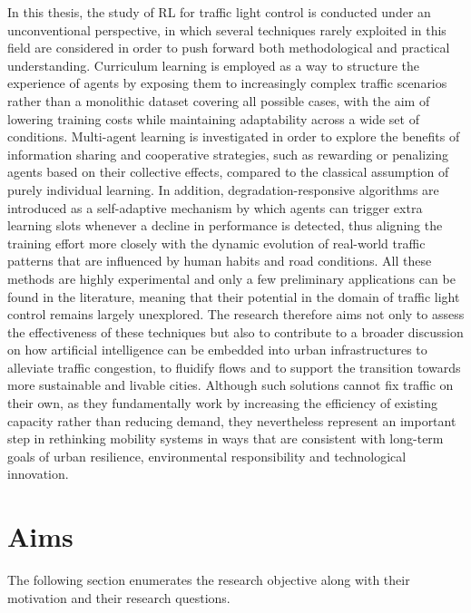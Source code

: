 In this thesis, the study of RL for traffic light control is conducted under an unconventional perspective, in which several techniques rarely exploited in this field are considered in order to push forward both methodological and practical understanding.
Curriculum learning is employed as a way to structure the experience of agents by exposing them to increasingly complex traffic scenarios rather than a monolithic dataset covering all possible cases, with the aim of lowering training costs while maintaining adaptability across a wide set of conditions.
Multi-agent learning is investigated in order to explore the benefits of information sharing and cooperative strategies, such as rewarding or penalizing agents based on their collective effects, compared to the classical assumption of purely individual learning.
In addition, degradation-responsive algorithms are introduced as a self-adaptive mechanism by which agents can trigger extra learning slots whenever a decline in performance is detected, thus aligning the training effort more closely with the dynamic evolution of real-world traffic patterns that are influenced by human habits and road conditions.
All these methods are highly experimental and only a few preliminary applications can be found in the literature, meaning that their potential in the domain of traffic light control remains largely unexplored.
The research therefore aims not only to assess the effectiveness of these techniques but also to contribute to a broader discussion on how artificial intelligence can be embedded into urban infrastructures to alleviate traffic congestion, to fluidify flows and to support the transition towards more sustainable and livable cities.
Although such solutions cannot fix traffic on their own, as they fundamentally work by increasing the efficiency of existing capacity rather than reducing demand, they nevertheless represent an important step in rethinking mobility systems in ways that are consistent with long-term goals of urban resilience, environmental responsibility and technological innovation.

\section{Aims}

The following section enumerates the research objective along with their motivation and their research questions.

